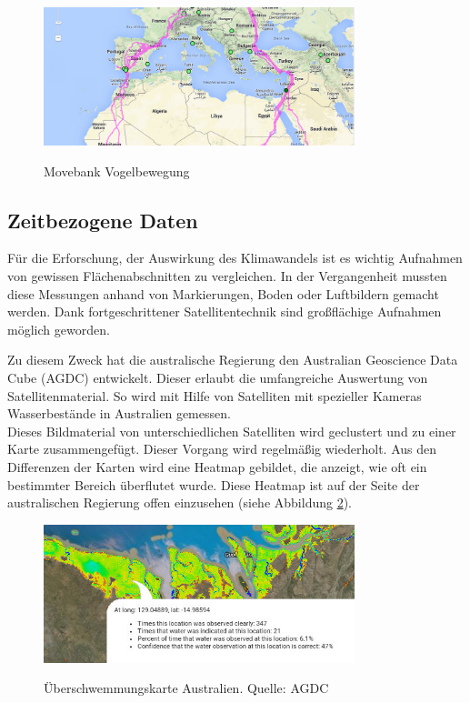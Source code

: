 \documentclass[10pt,conference,compsocconf]{IEEEtran}
\begin{document}
\begin{figure}[H]
  \centering
  	\includegraphics[height=114pt]{img/movebank}\\
  \caption[]{Movebank Vogelbewegung}
  \label{img:movebank}
\end{figure}


\subsection{Zeitbezogene Daten}
\label{sub:zeitbezogene_daten}
Für die Erforschung, der Auswirkung des Klimawandels ist es wichtig Aufnahmen von gewissen Flächenabschnitten zu vergleichen. In der Vergangenheit mussten diese Messungen anhand von Markierungen, Boden oder Luftbildern gemacht werden. Dank fortgeschrittener Satellitentechnik sind großflächige Aufnahmen möglich geworden.\par

Zu diesem Zweck hat die australische Regierung den Australian Geoscience Data Cube (AGDC) entwickelt. Dieser erlaubt die umfangreiche Auswertung von Satellitenmaterial. So wird mit Hilfe von Satelliten mit spezieller Kameras Wasserbestände in Australien gemessen.\\
Dieses Bildmaterial von unterschiedlichen Satelliten wird geclustert und zu einer Karte zusammengefügt. Dieser Vorgang wird regelmäßig wiederholt. Aus den Differenzen der Karten wird eine Heatmap gebildet, die anzeigt, wie oft ein bestimmter Bereich überflutet wurde. Diese Heatmap ist auf der Seite der australischen Regierung offen einzusehen (siehe Abbildung \ref{img:agcd_flood}).

\begin{figure}[H]
  \centering
  	\includegraphics[height=114pt]{img/agcd_flood}\\
  \caption[]{Überschwemmungskarte Australien. Quelle: AGDC\footnotemark}
  \label{img:agcd_flood}
\end{figure}
\end{document}
